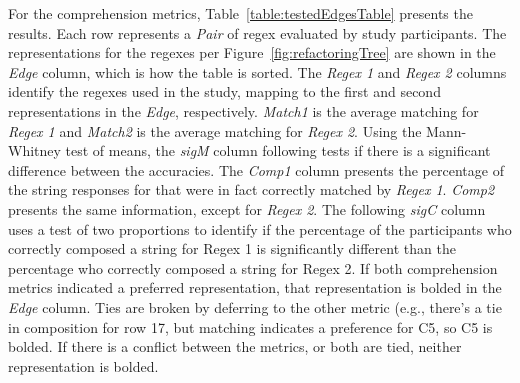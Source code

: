 For the comprehension metrics, Table~\ref{table:testedEdgesTable} presents the results.
Each row represents a {\em Pair} of regex evaluated by study participants.
The representations for the regexes per Figure~\ref{fig:refactoringTree} are shown in the {\em Edge} column, which is how the table is sorted. 
The {\em Regex 1} and {\em Regex 2} columns identify the regexes used in the study, mapping to the first and second representations in the {\em Edge}, respectively. 
{\em Match1} is the average matching for {\em Regex 1} and {\em Match2} is the average matching for {\em Regex 2}. 
Using the Mann-Whitney test of means, the {\em sigM} column following tests if there is a significant difference between the accuracies. 
The {\em Comp1} column presents the percentage of the string responses for that were in fact correctly matched by {\em Regex 1}. {\em Comp2} presents the same information, except for {\em Regex 2}. 
The following {\em sigC} column uses a test of two proportions to identify if the percentage of the participants who correctly composed a string for Regex 1 is significantly different than the percentage who correctly composed a string for {Regex 2}. 
If both comprehension metrics indicated a preferred representation, that representation is bolded in the \emph{Edge} column. Ties are broken by deferring to the other metric (e.g., there's a tie in composition for row 17, but matching indicates a preference for C5, so C5 is bolded. If there is a conflict between the metrics, or both are tied, neither representation is bolded. 



